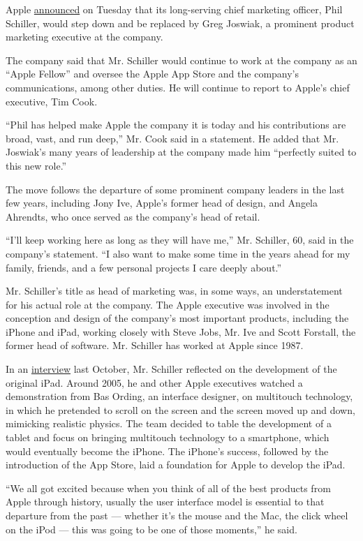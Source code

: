 Apple
\href{https://www.apple.com/newsroom/2020/08/phil-schiller-advances-to-apple-fellow/}{announced}
on Tuesday that its long-serving chief marketing officer, Phil Schiller,
would step down and be replaced by Greg Joswiak, a prominent product
marketing executive at the company.

The company said that Mr. Schiller would continue to work at the company
as an ``Apple Fellow'' and oversee the Apple App Store and the company's
communications, among other duties. He will continue to report to
Apple's chief executive, Tim Cook.

``Phil has helped make Apple the company it is today and his
contributions are broad, vast, and run deep,'' Mr. Cook said in a
statement. He added that Mr. Joswiak's many years of leadership at the
company made him ``perfectly suited to this new role.''

The move follows the departure of some prominent company leaders in the
last few years, including Jony Ive, Apple's former head of design, and
Angela Ahrendts, who once served as the company's head of retail.

``I'll keep working here as long as they will have me,'' Mr. Schiller,
60, said in the company's statement. ``I also want to make some time in
the years ahead for my family, friends, and a few personal projects I
care deeply about.''

Mr. Schiller's title as head of marketing was, in some ways, an
understatement for his actual role at the company. The Apple executive
was involved in the conception and design of the company's most
important products, including the iPhone and iPad, working closely with
Steve Jobs, Mr. Ive and Scott Forstall, the former head of software. Mr.
Schiller has worked at Apple since 1987.

In an
\href{https://www.nytimes.com/interactive/2019/12/15/technology/decade-in-tech.html}{interview}
last October, Mr. Schiller reflected on the development of the original
iPad. Around 2005, he and other Apple executives watched a demonstration
from Bas Ording, an interface designer, on multitouch technology, in
which he pretended to scroll on the screen and the screen moved up and
down, mimicking realistic physics. The team decided to table the
development of a tablet and focus on bringing multitouch technology to a
smartphone, which would eventually become the iPhone. The iPhone's
success, followed by the introduction of the App Store, laid a
foundation for Apple to develop the iPad.

``We all got excited because when you think of all of the best products
from Apple through history, usually the user interface model is
essential to that departure from the past --- whether it's the mouse and
the Mac, the click wheel on the iPod --- this was going to be one of
those moments,'' he said.

